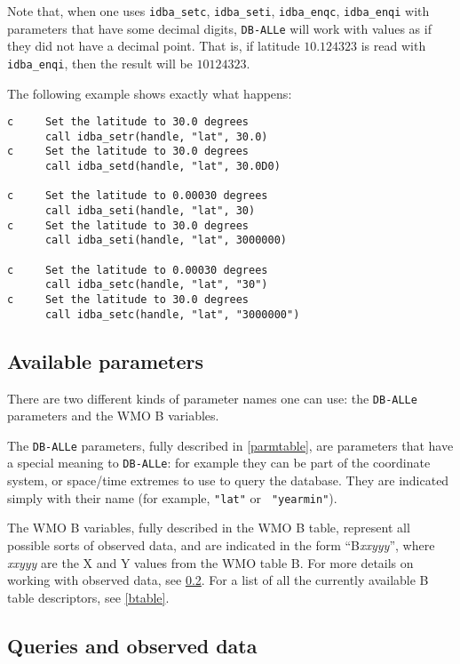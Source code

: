 \documentclass[draft,12pt,a4paper,twoside]{book}
\newcommand{\dballe}{{\tt DB-ALLe}}
\begin{document}
Note that, when one uses {\tt idba\_setc}, {\tt idba\_seti}, {\tt idba\_enqc},
{\tt idba\_enqi} with parameters that have some decimal digits, \dballe{} will
work with values as if they did not have a decimal point.  That is, if latitude
$10.124323$ is read with {\tt idba\_enqi}, then the result will be $10124323$.

The following example shows exactly what happens:

\begin{verbatim}
c     Set the latitude to 30.0 degrees
      call idba_setr(handle, "lat", 30.0)
c     Set the latitude to 30.0 degrees
      call idba_setd(handle, "lat", 30.0D0)

c     Set the latitude to 0.00030 degrees
      call idba_seti(handle, "lat", 30)
c     Set the latitude to 30.0 degrees
      call idba_seti(handle, "lat", 3000000)

c     Set the latitude to 0.00030 degrees
      call idba_setc(handle, "lat", "30")
c     Set the latitude to 30.0 degrees
      call idba_setc(handle, "lat", "3000000")
\end{verbatim}

\subsection {Available parameters}

There are two different kinds of parameter names one can use: the \dballe{}
parameters and the WMO B variables.

The \dballe{} parameters, fully described in \ref{parmtable}, are parameters
that have a special meaning to \dballe{}: for example they can be part of the
coordinate system, or space/time extremes to use to query the database.  They
are indicated simply with their name (for example, {\tt "lat"} or {\tt
"yearmin"}).

The WMO B variables, fully described in the WMO B table, represent all possible
sorts of observed data, and are indicated in the form ``B{\itshape xxyyy}'',
where {\itshape xxyyy} are the X and Y values from the WMO table B.  For more
details on working with observed data, see \ref{obsdata}.  For a list of all
the currently available B table descriptors, see \ref{btable}.


\subsection{Queries and observed data}
\label{obsdata}
\end{document}
